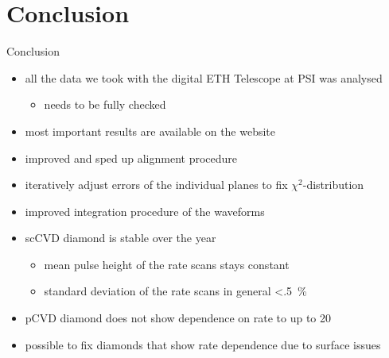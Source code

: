 \section{Conclusion}
\begin{frame}{Conclusion}

	\begin{minipage}[c][6cm]{\textwidth}
		\begin{itemize}\itemfill
			\item all the data we took with the digital ETH Telescope at PSI was analysed
			\begin{itemize}
				\item needs to be fully checked
			\end{itemize}
			\item most important results are available on the website
			\item improved and sped up alignment procedure
			\item iteratively adjust errors of the individual planes to fix $\chi^2$-distribution
			\item improved integration procedure of the waveforms
			\item scCVD diamond is stable over the year 
			\begin{itemize}
				\item mean pulse height of the rate scans stays constant
				\item standard deviation of the rate scans in general \SI{<.5}{\%}
			\end{itemize}
			\item pCVD diamond does not show dependence on rate to  up to \SI{20}{\mhzcm}
			\item possible to fix diamonds that show rate dependence due to surface issues
		\end{itemize}
	\end{minipage}
	
\end{frame}
